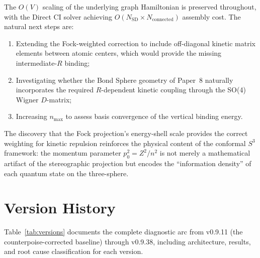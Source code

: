 \documentclass[aps,pra,twocolumn,superscriptaddress,longbibliography]{revtex4-2}
\begin{document}
The $O(V)$ scaling of the underlying graph Hamiltonian is preserved
throughout, with the Direct CI solver achieving
$O(N_{\mathrm{SD}}\times N_{\mathrm{connected}})$ assembly cost.
The natural next steps are:
\begin{enumerate}
\item Extending the Fock-weighted correction to include off-diagonal
kinetic matrix elements between atomic centers, which would provide
the missing intermediate-$R$ binding;
\item Investigating whether the Bond Sphere geometry of Paper~8
naturally incorporates the required $R$-dependent kinetic coupling
through the SO(4) Wigner $D$-matrix;
\item Increasing $n_{\max}$ to assess basis convergence of the
vertical binding energy.
\end{enumerate}
The discovery that the Fock projection's energy-shell scale provides
the correct weighting for kinetic repulsion reinforces the physical
content of the conformal $S^3$ framework: the momentum parameter
$p_0^2 = Z^2/n^2$ is not merely a mathematical artifact of the
stereographic projection but encodes the ``information density'' of
each quantum state on the three-sphere.

\appendix
\section{Version History}
\label{app:versions}

Table~\ref{tab:versions} documents the complete diagnostic arc from
v0.9.11 (the counterpoise-corrected baseline) through v0.9.38, including
architecture, results, and root cause classification for each version.
\end{document}
